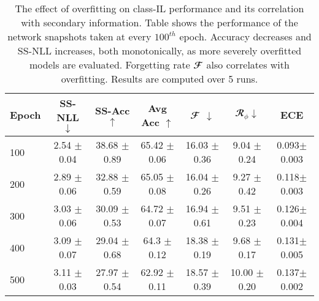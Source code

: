 \documentclass[final]{cvpr}
\newcommand{\cfr}{$\mathbfcal{R}_{\phi}$} \newcommand\todo[1]{(\textcolor{red}{TODO: #1})}
\begin{document}
  \begin{table*}[!t]
\centering
\begin{tabular}{|l@{\hskip3pt}|c@{\hskip3pt}|c@{\hskip3pt}|c@{\hskip3pt}|c|c|c|}
\hline
\textbf{Epoch}& \textbf{SS-NLL} $\downarrow$ & \textbf{SS-Acc} $\uparrow$ & \textbf{Avg Acc} $\uparrow$ & $\mathbfcal{F}$ $\downarrow$ & \cfr $\downarrow$ & ECE\\
    \hline
    \hline
    100 & 2.54 $\pm$ 0.04  & 38.68 $\pm$ 0.89  &   65.42  $\pm$ 0.06    & 16.03  $\pm$ 0.36  & 9.04  $\pm$ 0.24 & 0.093$\pm$0.003\\
    200 & 2.89 $\pm$ 0.06  & 32.88 $\pm$ 0.59  &   65.05  $\pm$ 0.08    & 16.04  $\pm$ 0.26  & 9.27  $\pm$ 0.42 & 0.118$\pm$0.003\\
    300 & 3.03 $\pm$ 0.06  & 30.09 $\pm$ 0.53  &   64.72  $\pm$ 0.07    & 16.94  $\pm$ 0.61  & 9.51  $\pm$ 0.23 & 0.126$\pm$0.004\\
    400 & 3.09 $\pm$ 0.07  & 29.04 $\pm$ 0.68  &   64.3   $\pm$ 0.12    & 18.38  $\pm$ 0.19  & 9.68  $\pm$ 0.17 & 0.131$\pm$0.005\\
    500 & 3.11 $\pm$ 0.03  & 27.97 $\pm$ 0.54  &   62.92  $\pm$ 0.11    & 18.57  $\pm$ 0.39  & 10.00  $\pm$ 0.20 & 0.137$\pm$0.002\\
    \hline
\end{tabular}
\vspace{5px}
\caption{The effect of overfitting on class-IL performance and its correlation with secondary information. Table shows the performance of the network snapshots taken at every $100^{th}$ epoch.
Accuracy decreases and SS-NLL increases, both monotonically, as more severely overfitted models are evaluated. Forgetting rate $\mathbfcal{F}$ also correlates with overfitting. Results are computed over 5 runs.}
\label{tab:overfit_std}
\end{table*}
\end{document}
